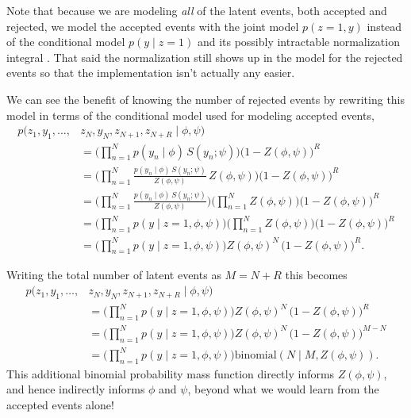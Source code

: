 \documentclass[
  letterpaper,
  DIV=11,
  numbers=noendperiod]{scrartcl}
\begin{document}
Note that because we are modeling \emph{all} of the latent events, both
accepted and rejected, we model the accepted events with the joint model
\(p(z = 1, y)\) instead of the conditional model \(p(y \mid z = 1)\) and
its possibly intractable normalization integral . That said the
normalization still shows up in the model for the rejected events so
that the implementation isn't actually any easier.

We can see the benefit of knowing the number of rejected events by
rewriting this model in terms of the conditional model used for modeling
accepted events, \begin{align*}
p( z_{1}, y_{1}, \ldots, &z_{N}, y_{N}, z_{N + 1}, z_{N + R} \mid \phi, \psi)
\\
&=
\bigg( \prod_{n = 1}^{N} p(y_{n} \mid \phi) \, S(y_{n}; \psi) \bigg)
\bigg( 1 - Z(\phi, \psi) \bigg)^{R}
\\
&=
\bigg( \prod_{n = 1}^{N}
\frac{ p(y_{n} \mid \phi) \, S(y_{n}; \psi) }
     { Z(\phi, \psi) } \, Z(\phi, \psi) \bigg)
\bigg( 1 - Z(\phi, \psi) \bigg)^{R}
\\
&=
\bigg( \prod_{n = 1}^{N} \frac{ p(y_{n} \mid \phi) \, S(y_{n}; \psi) }
                              { Z(\phi, \psi) } \bigg)
\bigg( \prod_{n = 1}^{N} Z(\phi, \psi) \bigg) \bigg( 1 - Z(\phi, \psi) \bigg)^{R}
\\
&=
\bigg( \prod_{n = 1}^{N} p(y \mid z = 1, \phi, \psi) \bigg)
\bigg( \prod_{n = 1}^{N} Z(\phi, \psi) \bigg) \bigg( 1 - Z(\phi, \psi) \bigg)^{R}
\\
&=
\bigg( \prod_{n = 1}^{N} p(y \mid z = 1, \phi, \psi) \bigg)
Z(\phi, \psi)^{N} \, \bigg( 1 - Z(\phi, \psi) \bigg)^{R}.
\end{align*}

Writing the total number of latent events as \(M = N + R\) this becomes
\begin{align*}
p( z_{1}, y_{1}, \ldots, &z_{N}, y_{N}, z_{N + 1}, z_{N + R} \mid \phi, \psi)
\\
&=
\bigg( \prod_{n = 1}^{N} p(y \mid z = 1, \phi, \psi) \bigg)
Z(\phi, \psi)^{N} \, \bigg( 1 - Z(\phi, \psi) \bigg)^{R}
\\
&=
\bigg( \prod_{n = 1}^{N} p(y \mid z = 1, \phi, \psi) \bigg)
Z(\phi, \psi)^{N} \, \bigg( 1 - Z(\phi, \psi) \bigg)^{M - N}
\\
&=
\bigg( \prod_{n = 1}^{N} p(y \mid z = 1, \phi, \psi) \bigg)
\text{binomial} \left( N \mid M, Z(\phi, \psi) \right).
\end{align*} This additional binomial probability mass function directly
informs \(Z(\phi, \psi)\), and hence indirectly informs \(\phi\) and
\(\psi\), beyond what we would learn from the accepted events alone!
\end{document}
